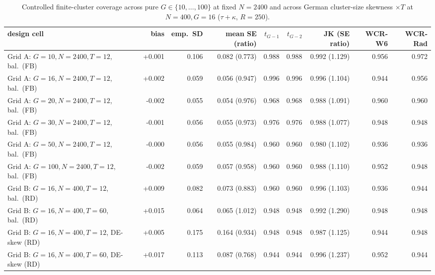 \begin{table}[!t]
\centering
\caption{Controlled finite-cluster coverage across pure $G \in \{10,\dots,100\}$ at fixed $N=2400$ and across German cluster-size skewness $\times T$ at $N=400, G=16$ ($\tau+\kappa$, $R=250$).}
\label{tab:rev-clustergrid}
\footnotesize
\setlength{\tabcolsep}{2.6pt}
\begin{adjustbox}{max width=\linewidth}
\begin{tabular}{lrrrrrrrr}
\toprule
design cell & bias & emp.\ SD & mean SE (ratio) & $t_{G-1}$ & $t_{G-2}$ & JK (SE ratio) & WCR-W6 & WCR-Rad \\
\midrule
Grid A: $G=10, N=2400, T=12$, bal.\ (FB) & +0.001 & 0.106 & 0.082 (0.773) & 0.988 & 0.988 & 0.992 (1.129) & 0.956 & 0.972 \\
Grid A: $G=16, N=2400, T=12$, bal.\ (FB) & +0.002 & 0.059 & 0.056 (0.947) & 0.996 & 0.996 & 0.996 (1.104) & 0.944 & 0.956 \\
Grid A: $G=20, N=2400, T=12$, bal.\ (FB) & -0.002 & 0.055 & 0.054 (0.976) & 0.968 & 0.968 & 0.988 (1.091) & 0.960 & 0.960 \\
Grid A: $G=30, N=2400, T=12$, bal.\ (FB) & -0.001 & 0.056 & 0.055 (0.973) & 0.976 & 0.976 & 0.988 (1.077) & 0.948 & 0.948 \\
Grid A: $G=50, N=2400, T=12$, bal.\ (FB) & -0.000 & 0.056 & 0.055 (0.984) & 0.960 & 0.960 & 0.980 (1.102) & 0.936 & 0.936 \\
Grid A: $G=100, N=2400, T=12$, bal.\ (FB) & -0.002 & 0.059 & 0.057 (0.958) & 0.960 & 0.960 & 0.988 (1.110) & 0.952 & 0.948 \\
\midrule
Grid B: $G=16, N=400, T=12$, bal.\ (RD) & +0.009 & 0.082 & 0.073 (0.883) & 0.960 & 0.960 & 0.996 (1.103) & 0.936 & 0.944 \\
Grid B: $G=16, N=400, T=60$, bal.\ (RD) & +0.015 & 0.064 & 0.065 (1.012) & 0.948 & 0.948 & 0.992 (1.290) & 0.948 & 0.948 \\
Grid B: $G=16, N=400, T=12$, DE-skew (RD) & +0.005 & 0.175 & 0.164 (0.934) & 0.948 & 0.948 & 0.987 (1.125) & 0.944 & 0.948 \\
Grid B: $G=16, N=400, T=60$, DE-skew (RD) & +0.017 & 0.113 & 0.087 (0.768) & 0.944 & 0.944 & 0.996 (1.237) & 0.952 & 0.944 \\
\bottomrule
\end{tabular}
\end{adjustbox}

\end{table}
